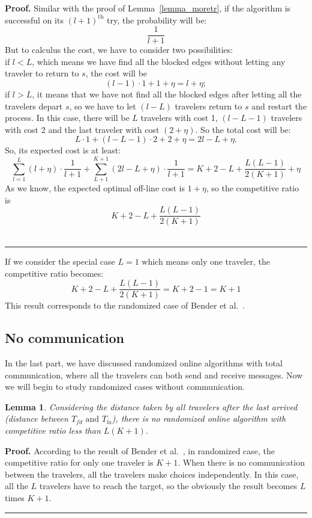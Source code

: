 \documentclass[letter-size, 11pt]{article}
\newtheorem{lemma}{Lemma}
\newenvironment{proof}[1][Proof]{\textbf{#1.} }{\ \rule{0.5em}{0.5em}}
\begin{document}
\begin{proof}
Similar with the proof of Lemma~\ref{lemma_moretr}, if the algorithm is successful on its $(l+1)^{\text{th}}$ try, the probability will be: 
\[
\frac{1}{l+1}
\]
But to calculus the cost, we have to consider two possibilities: 
\\if $l < L$, which means we have find all the blocked edges without letting any traveler to return to $s$, the cost will be 
\[
(l-1)\cdot1 + 1 +\eta = l + \eta;
\]
if $l > L$, it means that we have not find all the blocked edges after letting all the travelers depart $s$,  so we have to let $(l-L)$ travelers return to $s$ and restart the process. In this case, there will be $L$ travelers with cost 1, $(l-L-1)$ travelers with cost 2 and the last traveler with cost $(2+\eta)$. So the total cost will be:
\[
L\cdot 1 + (l-L-1)\cdot2 + 2 +\eta = 2l - L + \eta .
\]
So, its expected cost is at least:
\[
\sum_{l=1}^{L}(l+\eta)\cdot \frac{1}{l+1}  +  \sum_{L+1}^{K+1}(2l-L+\eta)\cdot \frac{1}{l+1}
 =K+2-L+ \frac{L(L-1)}{2(K+1)} + \eta
\]
As we know, the expected optimal off-line cost is $1 + \eta$, so the competitive ratio is 
\[
K+2-L+ \frac{L(L-1)}{2(K+1)}
\]
\end{proof}

If we consider the special case $L=1$ which means only one traveler, the competitive ratio becomes:
\[
K+2-L+ \frac{L(L-1)}{2(K+1)} = K+2-1 = K+1
\]
This result corresponds to the randomized case of Bender et al.~\cite{BeWe15}.

\subsection{No communication}

In the last part, we have discussed randomized online algorithms with total communication, where all the travelers can both send and receive messages. Now we will begin to study randomized cases without communication. 

\begin{lemma}
Considering the distance taken by all travelers after the last arrived (distance between $T_{fd} \mbox{\ and } T_{la}$), there is no randomized online algorithm with competitive ratio less than $ L(K+1)$.
\end{lemma}

\begin{proof} 
According to the result of Bender et al.~\cite{BeWe15}, in randomized case, the competitive ratio for only one traveler is $K+1$. When there is no communication between the travelers, all the travelers make choices independently. In this case, all the $L$ travelers have to reach the target, so the obviously the result becomes $L$ times $K+1$.
\end{proof}
\end{document}
